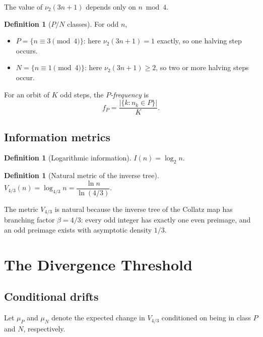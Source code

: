 \documentclass[12pt,reqno]{amsart}
\theoremstyle{plain}
\theoremstyle{definition}
\newtheorem{definition}[theorem]{Definition}
\newcommand{\nuTwo}{\nu_2}
\newcommand{\logtwo}{\log_2}
\newcommand{\fP}{f_P}
\newcommand{\muP}{\mu_P}
\newcommand{\muN}{\mu_N}
\newcommand{\Vmetric}{V_{4/3}}
\begin{document}
The value of $\nuTwo(3n+1)$ depends only on $n \bmod 4$.

\begin{definition}[$P/N$ classes]\label{def:PN}
For odd $n$,
\begin{itemize}
\item $P = \{n \equiv 3 \pmod{4}\}$: here $\nuTwo(3n+1) = 1$ exactly, so one halving step occurs.
\item $N = \{n \equiv 1 \pmod{4}\}$: here $\nuTwo(3n+1) \geq 2$, so two or more halving steps occur.
\end{itemize}
\end{definition}

For an orbit of $K$ odd steps, the \emph{$P$-frequency} is
\begin{equation}\label{eq:fP}
\fP = \frac{|\{k : n_k \in P\}|}{K}.
\end{equation}

\subsection{Information metrics}

\begin{definition}[Logarithmic information]\label{def:info}
$I(n) = \logtwo n$.
\end{definition}

\begin{definition}[Natural metric of the inverse tree]\label{def:Vmetric}
$\Vmetric(n) = \log_{4/3} n = \dfrac{\ln n}{\ln(4/3)}$.
\end{definition}

The metric $\Vmetric$ is natural because the inverse tree of the Collatz map
has branching factor $\beta = 4/3$: every odd integer has exactly one even
preimage, and an odd preimage exists with asymptotic density $1/3$.

\section{The Divergence Threshold}\label{sec:main}

\subsection{Conditional drifts}

Let $\muP$ and $\muN$ denote the expected change in $\Vmetric$ conditioned on
being in class $P$ and $N$, respectively.
\end{document}
